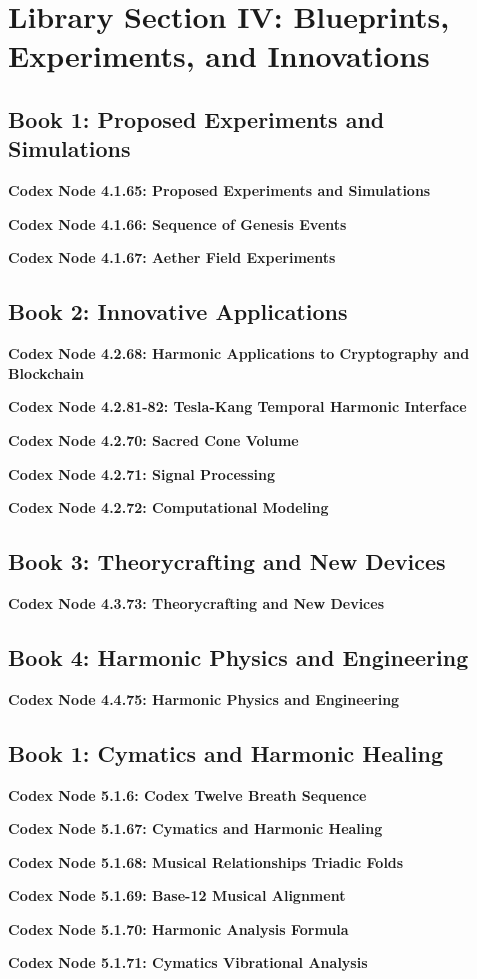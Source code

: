 \documentclass[a4paper,12pt]{book}
\newcommand{\codexnode}[5]{%
  \par\vspace{0.5em}%
  \noindent\textbf{Codex Node #1.#2.#3: #5}\label{#4}%
  \par\vspace{0.5em}%
}
\begin{document}
\section{Library Section IV: Blueprints, Experiments, and Innovations}

\subsection{Book 1: Proposed Experiments and Simulations}
\codexnode{4}{1}{65}{section4/book1/chapter1_proposed_experiments_and_simulations}{Proposed Experiments and Simulations}
\codexnode{4}{1}{66}{section4/book1/chapter1_sequence_of_genesis_events}{Sequence of Genesis Events}
\codexnode{4}{1}{67}{section4/book1/codex_aether_field_experiments}{Aether Field Experiments}

\subsection{Book 2: Innovative Applications}
\codexnode{4}{2}{68}{section4/book2/chapter2_harmonic_applications_cryptography_blockchain}{Harmonic Applications to Cryptography and Blockchain}
\codexnode{4}{2}{81-82}{section4/book2/codex_tesla_kang}{Tesla-Kang Temporal Harmonic Interface}
\codexnode{4}{2}{70}{section4/book2/chapter2_sacred_cone_volume}{Sacred Cone Volume}
\codexnode{4}{2}{71}{section4/book2/chapter2_signal_processing}{Signal Processing}
\codexnode{4}{2}{72}{section4/book2/chapter2_computational_modeling}{Computational Modeling}

\subsection{Book 3: Theorycrafting and New Devices}
\codexnode{4}{3}{73}{section4/book3/chapter3_theorycrafting_and_new_devices}{Theorycrafting and New Devices}
\subsection{Book 4: Harmonic Physics and Engineering}
\codexnode{4}{4}{75}{chapter4_harmonic_physics_and_engineering}{Harmonic Physics and Engineering}




\subsection{Book 1: Cymatics and Harmonic Healing}
\codexnode{5}{1}{6}{section5/book1/codex_twelve_breath_sequence}{Codex Twelve Breath Sequence}
\codexnode{5}{1}{67}{section5/book1/chapter1_cymatics_and_harmonic_healing}{Cymatics and Harmonic Healing}
\codexnode{5}{1}{68}{section5/book1/chapter1_musical_relationships_triadic_folds}{Musical Relationships Triadic Folds}
\codexnode{5}{1}{69}{section5/book1/chapter1_base_12_musical_alignment}{Base-12 Musical Alignment}
\codexnode{5}{1}{70}{section5/book1/chapter1_harmonic_analysis_formula}{Harmonic Analysis Formula}
\codexnode{5}{1}{71}{section5/book1/chapter1_cymatics_vibrational_analysis}{Cymatics Vibrational Analysis}
\end{document}
